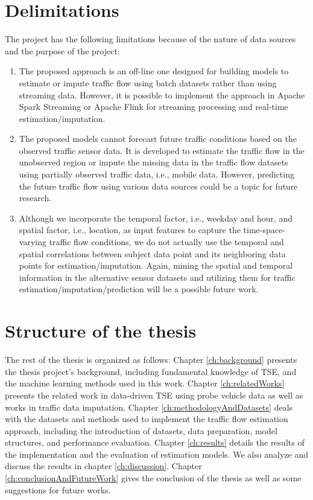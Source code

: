 \documentclass[english]{kththesis}
\begin{document}
\section{Delimitations}
\label{sec:delimitations}
The project has the following limitations because of the nature of data sources and the purpose of the project:
\begin{enumerate}
    \item The proposed approach is an off-line one designed for building models to estimate or impute traffic flow using batch datasets rather than using streaming data. However, it is possible to implement the approach in Apache Spark Streaming or Apache Flink for streaming processing and real-time estimation/imputation.
    \item The proposed models cannot forecast future traffic conditions based on the observed traffic sensor data. It is developed to estimate the traffic flow in the unobserved region or impute the missing data in the traffic flow datasets using partially observed traffic data, i.e., mobile data. However, predicting the future traffic flow using various data sources could be a topic for future research.
    \item Although we incorporate the temporal factor, i.e., weekday and hour, and spatial factor, i.e., location, as input features to capture the time-space-varying traffic flow conditions, we do not actually use the temporal and spatial correlations between subject data point and its neighboring data points for estimation/imputation. Again, mining the spatial and temporal information in the alternative sensor datasets and utilizing them for traffic estimation/imputation/prediction will be a possible future work.
\end{enumerate}


\section{Structure of the thesis}
\label{sec:structureOfThesis}
The rest of the thesis is organized as follows: Chapter \ref{ch:background} presents the thesis project's background, including fundamental knowledge of TSE, and the machine learning methods used in this work. Chapter \ref{ch:relatedWorks} presents the related work in data-driven TSE using probe vehicle data as well as works in traffic data imputation. Chapter \ref{ch:methodologyAndDatasets} deals with the datasets and methods used to implement the traffic flow estimation approach, including the introduction of datasets, data preparation, model structures, and performance evaluation. Chapter \ref{ch:results} details the results of the implementation and the evaluation of estimation models. We also analyze and discuss the results in chapter \ref{ch:discussion}. Chapter \ref{ch:conclusionAndFutureWork} gives the conclusion of the thesis as well as some suggestions for future works.
\end{document}
